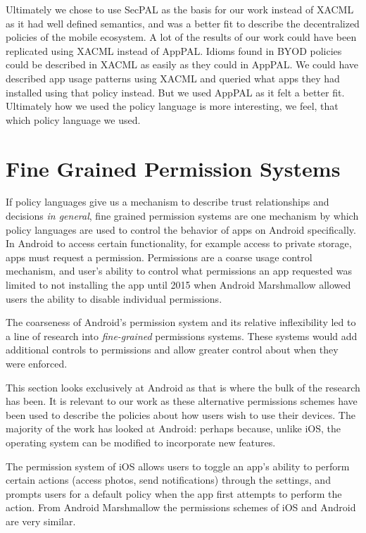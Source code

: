 \documentclass[thesis.tex]{subfiles}
\begin{document}
Ultimately we chose to use SecPAL as the basis for our work instead of XACML as
it had well defined semantics, and was a better fit to describe the
decentralized policies of the mobile ecosystem. A lot of the results of our work
could have been replicated using XACML instead of AppPAL. Idioms found in BYOD
policies could be described in XACML as easily as they could in AppPAL. We could
have described app usage patterns using XACML and queried what apps they had
installed using that policy instead. But we used AppPAL as it felt a better fit.
Ultimately how we used the policy language is more interesting, we feel, that
which policy language we used.

\section{Fine Grained Permission Systems}
\label{sec:fine-grained-permissions}

If policy languages give us a mechanism to describe trust relationships and
decisions \emph{in general}, fine grained permission systems are one mechanism
by which policy languages are used to control the behavior of apps on Android
specifically. In Android to access certain functionality, for example access to
private storage, apps must request a permission. Permissions are a coarse usage
control mechanism, and user's ability to control what permissions an app
requested was limited to not installing the app until 2015 when Android
Marshmallow allowed users the ability to disable individual permissions.

The coarseness of Android's permission system and its
relative inflexibility led to a line of research into
\emph{fine-grained} permissions systems.  These systems would add
additional controls to permissions and allow greater control about
when they were enforced.

This section looks exclusively at Android as that is where the bulk of the
research has been. It is relevant to our work as these alternative permissions
schemes have been used to describe the policies about how users wish to use
their devices. The majority of the work has looked at Android: perhaps because,
unlike iOS, the operating system can be modified to incorporate new features.

The permission system of iOS allows users to
toggle an app's ability to perform certain actions (access photos,
send notifications) through the settings, and prompts users for a
default policy when the app first attempts to perform the action.
From Android Marshmallow the permissions schemes of iOS and Android
are very similar.
\end{document}
